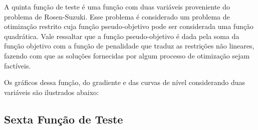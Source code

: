 A quinta função de teste é uma função com duas variáveis proveniente do problema de Rosen-Suzuki. Esse problema é considerado um problema de otimização restrito cuja função pseudo-objetivo pode ser considerada uma função quadrática. Vale ressaltar que a função pseudo-objetivo é dada pela soma da função objetivo com a função de penalidade que traduz as restrições não lineares, fazendo com que as soluções fornecidas por algum processo de otimização sejam factíveis.

Os gráficos dessa função, do gradiente e das curvas de nível considerando duas variáveis são ilustrados abaixo:

\subsection{Sexta Função de Teste}\label{sec:sexfun}



